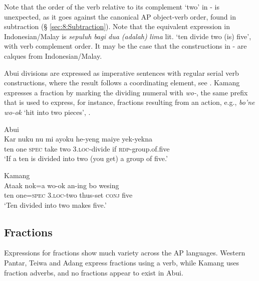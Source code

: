  

  

Note that the order of the verb relative to its complement `two' in - is unexpected, as it goes against the canonical AP object-verb order, found in subtraction ({\S} \ref{sec:8:Subtraction}). Note that the equivalent expression in Indonesian/Malay is \textit{sepuluh bagi dua (adalah)} \textit{lima} lit. `ten divide two (is) five', with verb complement order. It may be the case that the constructions in - are calques from Indonesian/Malay. 

Abui divisions are expressed as imperative sentences with regular serial verb constructions, where the result follows a coordinating element, see . Kamang expresses a fraction by marking the dividing numeral with \textit{wo-}, the same prefix that is used to express, for instance, fractions resulting from an action, e.g., \textit{bo'ne wo-ok} `hit into two pieces', . 


\ea%
\label{bkm:Ref358116296}
{\upshape Abui}\\
\gll  Kar  nuku  nu  mi  ayoku  he-yeng  maiye  yek-yekna \\  
    ten  one  \textsc{spec}  take  two  3.\textsc{loc-}divide  if  \textsc{rdp-}group.of.five \\
\glt  `If a ten is divided into two (you get) a group of five.'
\z



 




\ea
\label{ex:8:1247}
{\upshape Kamang}\\
 \gll Ataak  nok=a  wo-ok  an-ing  bo  wesing \\
  ten  one=\textsc{spec}  \textsc{3.loc}-two  thus-set  \textsc{conj}  five \\
 \glt`Ten divided into two makes five.'
\z


\subsection{Fractions}
\label{sec:8:Fractions}
Expressions for fractions show much variety across the AP languages. Western Pantar, Teiwa and Adang express fractions using a verb, while Kamang uses fraction adverbs, and no fractions appear to exist in Abui. 

